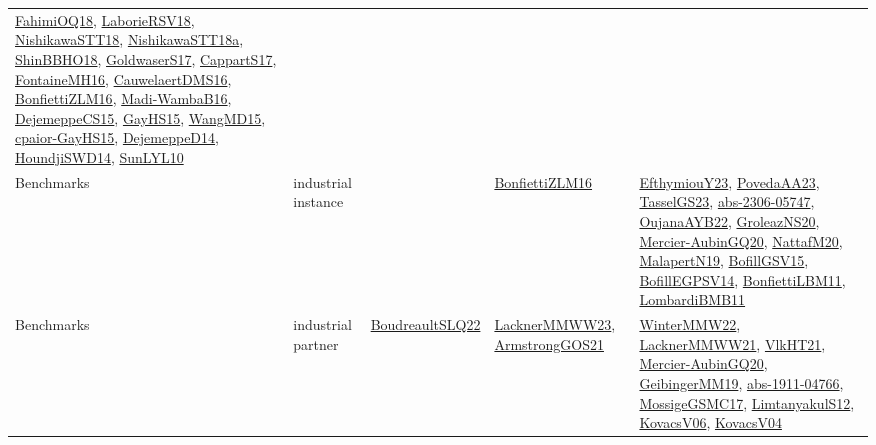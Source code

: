 {\begin{longtable}{lp{3cm}>{\raggedright}p{6cm}>{\raggedright}p{6cm}p{8cm}}
\href{articles/FahimiOQ18.pdf}{FahimiOQ18}\cite{FahimiOQ18}, \href{articles/LaborieRSV18.pdf}{LaborieRSV18}\cite{LaborieRSV18}, \href{papers/NishikawaSTT18.pdf}{NishikawaSTT18}\cite{NishikawaSTT18}, \href{papers/NishikawaSTT18a.pdf}{NishikawaSTT18a}\cite{NishikawaSTT18a}, \href{articles/ShinBBHO18.pdf}{ShinBBHO18}\cite{ShinBBHO18}, \href{papers/GoldwaserS17.pdf}{GoldwaserS17}\cite{GoldwaserS17}, \href{papers/CappartS17.pdf}{CappartS17}\cite{CappartS17}, \href{papers/FontaineMH16.pdf}{FontaineMH16}\cite{FontaineMH16}, \href{papers/CauwelaertDMS16.pdf}{CauwelaertDMS16}\cite{CauwelaertDMS16}, \href{papers/BonfiettiZLM16.pdf}{BonfiettiZLM16}\cite{BonfiettiZLM16}, \href{papers/Madi-WambaB16.pdf}{Madi-WambaB16}\cite{Madi-WambaB16}, \href{papers/DejemeppeCS15.pdf}{DejemeppeCS15}\cite{DejemeppeCS15}, \href{papers/GayHS15.pdf}{GayHS15}\cite{GayHS15}, \href{articles/WangMD15.pdf}{WangMD15}\cite{WangMD15}, \href{papers/cpaior-GayHS15.pdf}{cpaior-GayHS15}\cite{cpaior-GayHS15}, \href{papers/DejemeppeD14.pdf}{DejemeppeD14}\cite{DejemeppeD14}, \href{papers/HoundjiSWD14.pdf}{HoundjiSWD14}\cite{HoundjiSWD14}, \href{papers/SunLYL10.pdf}{SunLYL10}\cite{SunLYL10}\\
Benchmarks & industrial instance &  & \href{papers/BonfiettiZLM16.pdf}{BonfiettiZLM16}\cite{BonfiettiZLM16} & \href{papers/EfthymiouY23.pdf}{EfthymiouY23}\cite{EfthymiouY23}, \href{papers/PovedaAA23.pdf}{PovedaAA23}\cite{PovedaAA23}, \href{papers/TasselGS23.pdf}{TasselGS23}\cite{TasselGS23}, \href{articles/abs-2306-05747.pdf}{abs-2306-05747}\cite{abs-2306-05747}, \href{papers/OujanaAYB22.pdf}{OujanaAYB22}\cite{OujanaAYB22}, \href{papers/GroleazNS20.pdf}{GroleazNS20}\cite{GroleazNS20}, \href{papers/Mercier-AubinGQ20.pdf}{Mercier-AubinGQ20}\cite{Mercier-AubinGQ20}, \href{papers/NattafM20.pdf}{NattafM20}\cite{NattafM20}, \href{papers/MalapertN19.pdf}{MalapertN19}\cite{MalapertN19}, \href{papers/BofillGSV15.pdf}{BofillGSV15}\cite{BofillGSV15}, \href{papers/BofillEGPSV14.pdf}{BofillEGPSV14}\cite{BofillEGPSV14}, \href{papers/BonfiettiLBM11.pdf}{BonfiettiLBM11}\cite{BonfiettiLBM11}, \href{papers/LombardiBMB11.pdf}{LombardiBMB11}\cite{LombardiBMB11}\\
Benchmarks & industrial partner & \href{papers/BoudreaultSLQ22.pdf}{BoudreaultSLQ22}\cite{BoudreaultSLQ22} & \href{articles/LacknerMMWW23.pdf}{LacknerMMWW23}\cite{LacknerMMWW23}, \href{papers/ArmstrongGOS21.pdf}{ArmstrongGOS21}\cite{ArmstrongGOS21} & \href{papers/WinterMMW22.pdf}{WinterMMW22}\cite{WinterMMW22}, \href{papers/LacknerMMWW21.pdf}{LacknerMMWW21}\cite{LacknerMMWW21}, \href{articles/VlkHT21.pdf}{VlkHT21}\cite{VlkHT21}, \href{papers/Mercier-AubinGQ20.pdf}{Mercier-AubinGQ20}\cite{Mercier-AubinGQ20}, \href{papers/GeibingerMM19.pdf}{GeibingerMM19}\cite{GeibingerMM19}, \href{articles/abs-1911-04766.pdf}{abs-1911-04766}\cite{abs-1911-04766}, \href{papers/MossigeGSMC17.pdf}{MossigeGSMC17}\cite{MossigeGSMC17}, \href{articles/LimtanyakulS12.pdf}{LimtanyakulS12}\cite{LimtanyakulS12}, \href{papers/KovacsV06.pdf}{KovacsV06}\cite{KovacsV06}, \href{papers/KovacsV04.pdf}{KovacsV04}\cite{KovacsV04}\\

\end{longtable}}
